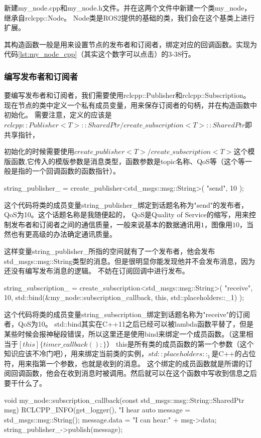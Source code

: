 新建my\_node.cpp和my\_node.h文件。并在这两个文件中新建一个类my\_node，继承自rclcpp::Node。
Node类是ROS2提供的基础的类，我们会在这个基类上进行扩展。

其构造函数一般是用来设置节点的发布者和订阅者，绑定对应的回调函数。实现为代码\ref{lst:my_node_cpp}（其实这个数字可以点击）的3-38行。
\subsubsection{编写发布者和订阅者}
要编写发布者和订阅者，我们需要使用rclcpp::Publisher和rclcpp::Subscription。
现在节点的类中定义一个私有成员变量，用来保存订阅者的句柄，并在构造函数中初始化。
需要注意，定义的应该是$rclcpp::Publisher<T>::SharedPtr/create\_subscription<T>::SharedPtr$即共享指针，

初始化的时候需要使用$create\_publisher<T>/create\_subscription<T>$这个模版函数,它传入的模版参数是消息类型，函数参数是topic名称、QoS等（这个等一般是指的一个回调函数的函数指针）。


\begin{tcode}
    string_publisher_ = create_publisher<std_msgs::msg::String>(
         "send",
         10
         );
\end{tcode}
这个代码将类的成员变量string\_publisher\_绑定到话题名称为"send"的发布者，QoS为10。这个话题名称是我随便起的，
QoS是Quality of Service的缩写，用来控制发布者和订阅者之间的通信质量，一般来说基本的数据通讯用$1$，图像用$10$，当然也有更高级的办法确定通讯质量。

这样变量string\_publisher\_所指的空间就有了一个发布者，他会发布std\_msgs::msg::String类型的消息。但是很明显你能发现他并不会发布消息，因为还没有编写发布消息的逻辑。
不妨在订阅回调中进行发布。

\begin{tcode}
    string_subscription_ = create_subscription<std_msgs::msg::String>(
         "receive",
         10,
         std::bind(&my_node::subscription_callback, this, std::placeholders::_1)
         );
\end{tcode}
这个代码将类的成员变量string\_subscription\_绑定到话题名称为"receive"的订阅者，QoS为10。
std::bind其实在C++11之后已经可以被lambda函数平替了，但是某些时候会报神秘段错误，所以这里还是使用bind来绑定一个成员函数。（这里相当于$[this] \{ timer\_callback(); \}$）
this是所有类的成员函数的第一个参数（这个知识应该不冷门吧），用来绑定当前类的实例，$std::placeholders::_1$是C++的占位符，用来指第一个参数，也就是收到的消息。
这个绑定的成员函数就是所谓的订阅回调函数，他会在收到消息时被调用。然后就可以在这个函数中写收到信息之后要干什么了。
\begin{tcode}
void my_node::subscription_callback(const std_msgs::msg::String::SharedPtr msg)
{
 RCLCPP_INFO(get_logger(), "I hear %
 auto message = std_msgs::msg::String();
 message.data = "I can hear:" + msg->data;
 string_publisher_->publish(message);
}
\end{tcode}

